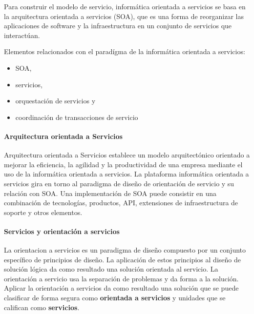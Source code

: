  Para construir el modelo de servicio, informática orientada a servicios se basa en la arquitectura orientada a servicios (SOA), que es una forma de reorganizar las aplicaciones de software y la infraestructura en un conjunto de servicios que interactúan.  
 
  \begin{tcolorbox}
  	[colback=green!5!white,colframe=green!75!black,fonttitle=\bfseries, title=Elementos del parad\'igma de la inform\'atica orientada a servicios]
   Elementos relacionados con el parad\'igma de la inform\'atica orientada a servicios: 
   \begin{itemize}
   		\item SOA,
   		\item servicios, 
   		\item orquestación de servicios y
   		\item  coordinación de transacciones de servicio
   \end{itemize} 
  \end{tcolorbox}
 
\paragraph{Arquitectura orientada a Servicios}

Arquitectura orientada a Servicios establece un modelo arquitectónico orientado a mejorar la eficiencia, la agilidad y la productividad de una empresa mediante el uso de la informática orientada a servicios.
 La plataforma informática orientada a servicios gira en torno al paradigma de diseño de orientación de servicio y su relación con SOA. 
 Una implementación de SOA puede consistir en una combinación de tecnologías, productos, API, extensiones de infraestructura de soporte y otros elementos.
 
 
 \paragraph{Servicios y orientación a servicios}
 
La  \gls{orientacion a servicios} es un paradigma de diseño compuesto por un 	conjunto específico de principios de diseño.   La aplicación de estos principios al diseño de solución lógica da como resultado una solución orientada al servicio.
 La orientación a servicio usa la separación de problemas y da forma a la solución. 	Aplicar la orientación a servicios  da como resultado una solución que se puede clasificar de forma segura como \textbf{orientada a servicios} y unidades que se califican como \textbf{servicios}. 
 

